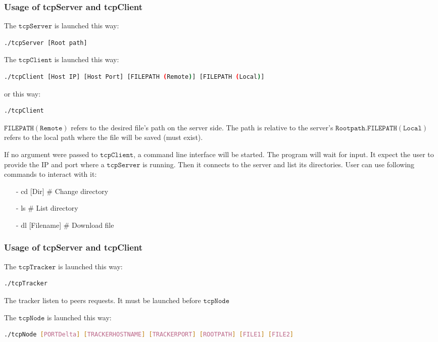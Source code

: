 \subsubsection{Usage of tcpServer and tcpClient}
The  $\mathtt{tcpServer}$ is launched this way:
\begin{lstlisting}[language=bash]
./tcpServer [Root path]
\end{lstlisting}
The  $\mathtt{tcpClient}$ is launched this way:
\begin{lstlisting}[language=bash]
./tcpClient [Host IP] [Host Port] [FILEPATH (Remote)] [FILEPATH (Local)]
\end{lstlisting}
or this way:
\begin{lstlisting}[language=bash]
./tcpClient
\end{lstlisting}
$\mathtt{FILEPATH (Remote)}$ refers to the desired file's path on the server side. The path is relative to the server's $\mathtt{Root path}$.$\mathtt{FILEPATH (Local)}$ refers to the local path where the file will be saved (must exist).

If no argument were passed to $\mathtt{tcpClient}$, a command line interface will be started. The program will wait for input. It expect the user to provide the IP and port where a $\mathtt{tcpServer}$ is running. Then it connects to the server and list its directories. User can use following commands to interact with it:
\begin{itemize}
\setlength{\itemsep}{0pt}
\item[-] cd [Dir]           \# Change directory
\item[-] ls                    \# List directory
\item[-] dl  [Filename] \# Download file
\end{itemize}

\subsubsection{Usage of tcpServer and tcpClient}
The  $\mathtt{tcpTracker}$ is launched this way:
\begin{lstlisting}[language=bash]
./tcpTracker 
\end{lstlisting} 
The tracker listen to peers requests. It must be launched before $\mathtt{tcpNode}$

The  $\mathtt{tcpNode}$ is launched this way:
\begin{lstlisting}[language=bash]
./tcpNode [PORTDelta] [TRACKERHOSTNAME] [TRACKERPORT] [ROOTPATH] [FILE1] [FILE2] 
\end{lstlisting} 

